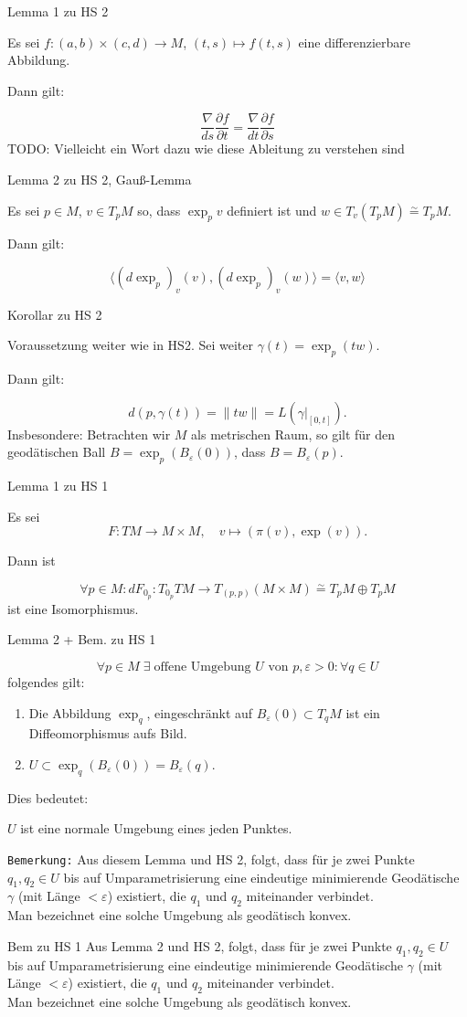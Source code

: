 \documentclass[a6paper,11pt,grid=front]{kartei}
\newcommand{\fl}[1]{\begin{flushleft}
 #1 \end{flushleft}}
\newcommand{\eps}{\varepsilon}
\newcounter{def}
\begin{document}
\nonameyet
{Lemma 1} {zu HS 2}
{
Es sei $f: (a,b) \times (c,d) \to M$, $(t,s) \mapsto f(t,s)$ eine 
differenzierbare Abbildung.
\fl{Dann gilt:}
\[
\frac{\nabla}{ds} \frac{\partial f}{\partial t} 
= \frac{\nabla}{dt} \frac{\partial f}{\partial s}
\]	
TODO: Vielleicht ein Wort dazu wie diese Ableitung zu verstehen sind
}
{}

\nonameyet
{Lemma 2} {\small zu HS 2, Gauß-Lemma}
{
Es sei $p\in M$, $v\in T_pM$ so, dass $\exp_p v$ definiert ist
und $w\in T_v (T_p M) \overset{\sim}{=} T_pM$. 

\fl{Dann gilt:}
\[
\langle (d \exp_p)_v (v), (d \exp_p)_v(w) \rangle
= \langle v, w \rangle 
\]
}
{}

\nonameyet
{Korollar} {zu HS 2}
{
Voraussetzung weiter wie in HS2. Sei weiter 
$\gamma(t) = \exp_p(tw)$.
\fl{Dann gilt:}
\[
d(p,\gamma(t)) = \| tw \| = L(\gamma|_{[0,t]}).
\]
Insbesondere: Betrachten wir $M$ als metrischen Raum, so gilt für den
geodätischen Ball $B = \exp_p(B_\eps (0))$, dass $B = B_\eps(p)$.
}
{}


\nonameyet
{Lemma 1} {zu HS 1}
{
Es sei 
\[
F: TM \to M \times M, \quad v \mapsto (\pi(v), \exp(v)).
\]
\fl{Dann ist}
\[
\forall p\in M : dF_{0_p}: T_{0_p}TM \to T_{(p,p)}(M \times M)
\overset{\sim}{=} T_pM \oplus T_pM
\]
ist eine Isomorphismus.
}
{}


\nonameyet
{Lemma 2 + Bem.} {zu HS 1}
{
\small
\[
\forall p \in M \; \exists \; \text{offene Umgebung $U$ von } p, \eps > 0: 
\forall q\in U
\]
folgendes gilt:
\begin{enumerate}[1.]
\item  Die Abbildung $\exp_q$, eingeschränkt auf $B_\eps(0) \subset T_qM$ 
ist ein Diffeomorphismus aufs Bild.
\item $U\subset \exp_q(B_\eps(0)) = B_\eps(q)$.
\end{enumerate}
%
\fl{Dies bedeutet:}
$U$ ist eine normale Umgebung eines jeden Punktes.
\fl{\texttt{Bemerkung:}
Aus diesem Lemma und HS 2, folgt, dass für je zwei Punkte $q_1, q_2 \in U$ 
bis auf Umparametrisierung eine eindeutige minimierende Geodätische 
$\gamma$ (mit Länge $< \eps$) existiert, die $q_1$ und $q_2$
miteinander verbindet.
\\
Man bezeichnet eine solche Umgebung als geodätisch konvex.}
}
{}

\nonameyet
{Bem} {zu HS 1}
{
Aus Lemma 2 und HS 2, folgt, dass für je zwei Punkte $q_1, q_2 \in U$ bis auf
Umparametrisierung eine eindeutige minimierende Geodätische $\gamma$ (mit 
Länge $< \eps$) existiert, die $q_1$ und $q_2$ miteinander verbindet.
\\
Man bezeichnet eine solche Umgebung als geodätisch konvex.
}
{}
\end{document}
